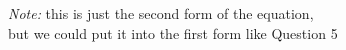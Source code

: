 \documentclass[preview]{standalone}
\begin{document}
\begin{center}
\raggedright
                \textit{Note: } this is just the second form of the equation, \\
                but we could put it into the first form like Question 5
\end{center}
\end{document}
